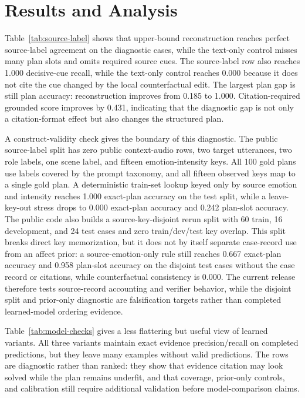 \documentclass{article}
\begin{document}
\begin{table}[t]
\centering

\caption{Dependency-free acoustic preflight over 300 public-safe feature rows. These checks verify the speech evidence channel but do not support listener judgments.}
\label{tab:acoustic-preflight}
\end{table}

\section{Results and Analysis}
Table~\ref{tab:source-label} shows that upper-bound reconstruction reaches perfect source-label agreement on the diagnostic cases, while the text-only control misses many plan slots and omits required source cues. The source-label row also reaches 1.000 decisive-cue recall, while the text-only control reaches 0.000 because it does not cite the cue changed by the local counterfactual edit. The largest plan gap is still plan accuracy: reconstruction improves from 0.185 to 1.000. Citation-required grounded score improves by 0.431, indicating that the diagnostic gap is not only a citation-format effect but also changes the structured plan.

A construct-validity check gives the boundary of this diagnostic. The public source-label split has zero public context-audio rows, two target utterances, two role labels, one scene label, and fifteen emotion-intensity keys. All 100 gold plans use labels covered by the prompt taxonomy, and all fifteen observed keys map to a single gold plan. A deterministic train-set lookup keyed only by source emotion and intensity reaches 1.000 exact-plan accuracy on the test split, while a leave-key-out stress drops to 0.000 exact-plan accuracy and 0.242 plan-slot accuracy. The public code also builds a source-key-disjoint rerun split with 60 train, 16 development, and 24 test cases and zero train/dev/test key overlap. This split breaks direct key memorization, but it does not by itself separate case-record use from an affect prior: a source-emotion-only rule still reaches 0.667 exact-plan accuracy and 0.958 plan-slot accuracy on the disjoint test cases without the case record or citations, while counterfactual consistency is 0.000. The current release therefore tests source-record accounting and verifier behavior, while the disjoint split and prior-only diagnostic are falsification targets rather than completed learned-model ordering evidence.

Table~\ref{tab:model-checks} gives a less flattering but useful view of learned variants. All three variants maintain exact evidence precision/recall on completed predictions, but they leave many examples without valid predictions. The rows are diagnostic rather than ranked: they show that evidence citation may look solved while the plan remains underfit, and that coverage, prior-only controls, and calibration still require additional validation before model-comparison claims.
\end{document}

